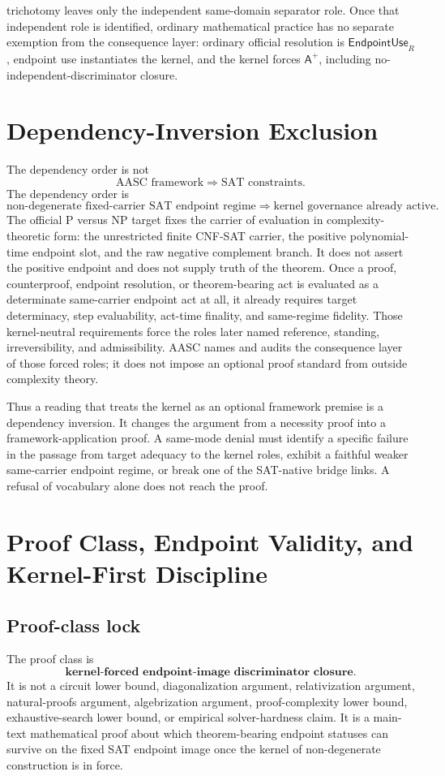 \documentclass[11pt]{article}
\theoremstyle{definition}
\theoremstyle{remark}
\newcommand{\Aplus}{\mathsf{A}^{+}}
\newcommand{\EndpointUse}{\mathsf{EndpointUse}}
\begin{document}
trichotomy leaves only the independent same-domain separator role. Once that independent role is identified, ordinary mathematical practice has no separate exemption from the consequence layer: ordinary official resolution is \(\EndpointUse_R\), endpoint use instantiates the kernel, and the kernel forces \(\Aplus\), including no-independent-discriminator closure.

\section*{Dependency-Inversion Exclusion}
The dependency order is not
\[
  \text{AASC framework} \Rightarrow \text{SAT constraints}.
\]
The dependency order is
\[
  \text{non-degenerate fixed-carrier SAT endpoint regime}
  \Rightarrow \text{kernel governance already active}.
\]
The official P versus NP target fixes the carrier of evaluation in complexity-theoretic form: the unrestricted finite CNF-SAT carrier, the positive polynomial-time endpoint slot, and the raw negative complement branch. It does not assert the positive endpoint and does not supply truth of the theorem. Once a proof, counterproof, endpoint resolution, or theorem-bearing act is evaluated as a determinate same-carrier endpoint act at all, it already requires target determinacy, step evaluability, act-time finality, and same-regime fidelity. Those kernel-neutral requirements force the roles later named reference, standing, irreversibility, and admissibility. AASC names and audits the consequence layer of those forced roles; it does not impose an optional proof standard from outside complexity theory.

Thus a reading that treats the kernel as an optional framework premise is a dependency inversion. It changes the argument from a necessity proof into a framework-application proof. A same-mode denial must identify a specific failure in the passage from target adequacy to the kernel roles, exhibit a faithful weaker same-carrier endpoint regime, or break one of the SAT-native bridge links. A refusal of vocabulary alone does not reach the proof.

\tableofcontents
\newpage

\section{Proof Class, Endpoint Validity, and Kernel-First Discipline}

\subsection{Proof-class lock}
The proof class is
\[
  \textbf{kernel-forced endpoint-image discriminator closure.}
\]
It is not a circuit lower bound, diagonalization argument, relativization argument, natural-proofs argument, algebrization argument, proof-complexity lower bound, exhaustive-search lower bound, or empirical solver-hardness claim. It is a main-text mathematical proof about which theorem-bearing endpoint statuses can survive on the fixed SAT endpoint image once the kernel of non-degenerate construction is in force.
\end{document}
